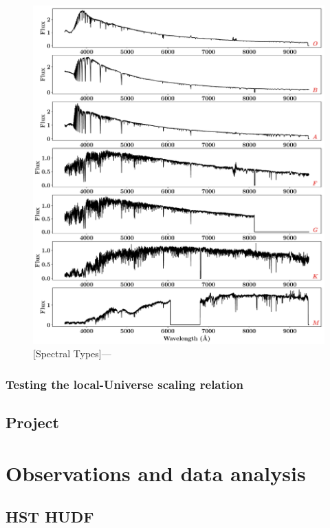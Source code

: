 \documentclass[12pt, twocolumn]{revtex4}    %
\begin{document}
\begin{figure}
\includegraphics[width=1.0\linewidth]{introduction/spectral_types}
\captionsetup{justification=raggedright}
[Spectral Types]{---}
\label{fig:spectral_types}
\end{figure}


\subsubsection{Testing the local-Universe scaling relation}

\subsection{Project} %

\section{Observations and data analysis}

\subsection{HST HUDF}
\end{document}
